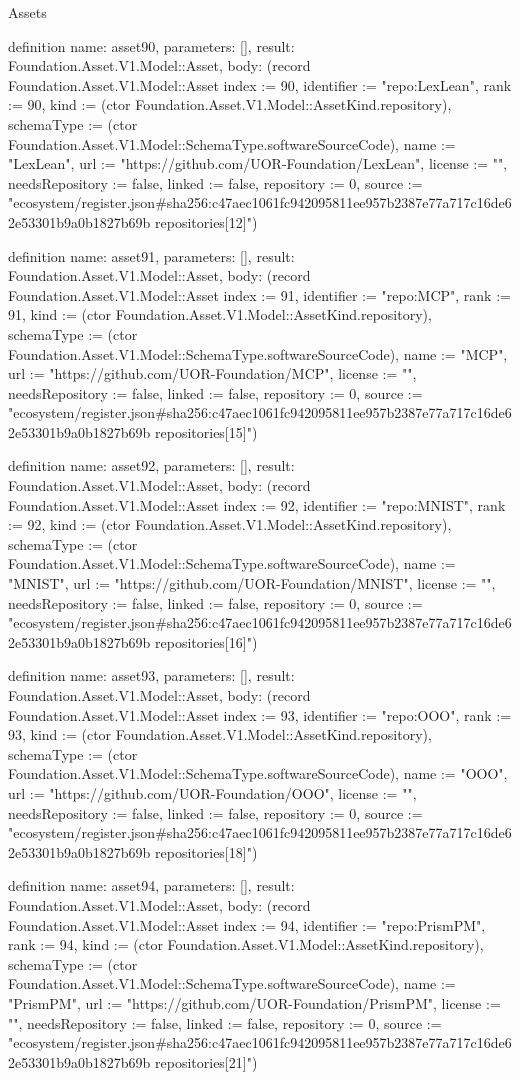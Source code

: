 \begin{lexlean}{Assets}
\begin{semanticmodule}
definition{
  name: asset90,
  parameters: [],
  result: Foundation.Asset.V1.Model::Asset,
  body: (record Foundation.Asset.V1.Model::Asset {index := 90, identifier := "repo:LexLean", rank := 90, kind := (ctor Foundation.Asset.V1.Model::AssetKind.repository), schemaType := (ctor Foundation.Asset.V1.Model::SchemaType.softwareSourceCode), name := "LexLean", url := "https://github.com/UOR-Foundation/LexLean", license := "", needsRepository := false, linked := false, repository := 0, source := "ecosystem/register.json#sha256:c47aec1061fc942095811ee957b2387e77a717c16de62e53301b9a0b1827b69b repositories[12]"})
}

definition{
  name: asset91,
  parameters: [],
  result: Foundation.Asset.V1.Model::Asset,
  body: (record Foundation.Asset.V1.Model::Asset {index := 91, identifier := "repo:MCP", rank := 91, kind := (ctor Foundation.Asset.V1.Model::AssetKind.repository), schemaType := (ctor Foundation.Asset.V1.Model::SchemaType.softwareSourceCode), name := "MCP", url := "https://github.com/UOR-Foundation/MCP", license := "", needsRepository := false, linked := false, repository := 0, source := "ecosystem/register.json#sha256:c47aec1061fc942095811ee957b2387e77a717c16de62e53301b9a0b1827b69b repositories[15]"})
}

definition{
  name: asset92,
  parameters: [],
  result: Foundation.Asset.V1.Model::Asset,
  body: (record Foundation.Asset.V1.Model::Asset {index := 92, identifier := "repo:MNIST", rank := 92, kind := (ctor Foundation.Asset.V1.Model::AssetKind.repository), schemaType := (ctor Foundation.Asset.V1.Model::SchemaType.softwareSourceCode), name := "MNIST", url := "https://github.com/UOR-Foundation/MNIST", license := "", needsRepository := false, linked := false, repository := 0, source := "ecosystem/register.json#sha256:c47aec1061fc942095811ee957b2387e77a717c16de62e53301b9a0b1827b69b repositories[16]"})
}

definition{
  name: asset93,
  parameters: [],
  result: Foundation.Asset.V1.Model::Asset,
  body: (record Foundation.Asset.V1.Model::Asset {index := 93, identifier := "repo:OOO", rank := 93, kind := (ctor Foundation.Asset.V1.Model::AssetKind.repository), schemaType := (ctor Foundation.Asset.V1.Model::SchemaType.softwareSourceCode), name := "OOO", url := "https://github.com/UOR-Foundation/OOO", license := "", needsRepository := false, linked := false, repository := 0, source := "ecosystem/register.json#sha256:c47aec1061fc942095811ee957b2387e77a717c16de62e53301b9a0b1827b69b repositories[18]"})
}

definition{
  name: asset94,
  parameters: [],
  result: Foundation.Asset.V1.Model::Asset,
  body: (record Foundation.Asset.V1.Model::Asset {index := 94, identifier := "repo:PrismPM", rank := 94, kind := (ctor Foundation.Asset.V1.Model::AssetKind.repository), schemaType := (ctor Foundation.Asset.V1.Model::SchemaType.softwareSourceCode), name := "PrismPM", url := "https://github.com/UOR-Foundation/PrismPM", license := "", needsRepository := false, linked := false, repository := 0, source := "ecosystem/register.json#sha256:c47aec1061fc942095811ee957b2387e77a717c16de62e53301b9a0b1827b69b repositories[21]"})
}


\end{semanticmodule}
\end{lexlean}
